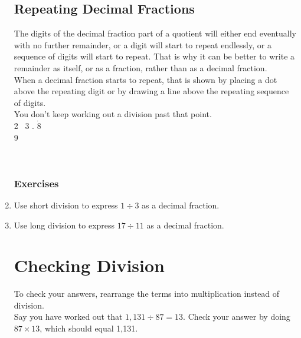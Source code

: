 \documentclass{article}
\begin{document}
\begin{enumerate}
\subsection*{Repeating Decimal Fractions}
The digits of the decimal fraction part of a quotient will either end eventually with no further remainder, or a digit will start to repeat endlessly, or a sequence of digits will start to repeat. That is why it can be better to write a remainder as itself, or as a fraction, rather than as a decimal fraction.\\

When a decimal fraction starts to repeat, that is shown by placing a dot above the repeating digit or by drawing a line above the repeating sequence of digits.\\

You don't keep working out a division past that point.\\

\hspace{12ex} 2 \ 3 . $\dot{8}$\\
\vspace{1pt}
\hspace{10ex} 9\ 

\begin{center}
\end{center}\\

\subsubsection{Exercises}

\item Use short division to express $1 \div 3$ as a decimal fraction.
\item Use long division to express $17 \div 11$ as a decimal fraction.

\pagebreak

\section{Checking Division}

To check your answers, rearrange the terms into multiplication instead of division.\\

Say you have worked out that $1,131 \div 87 = 13$. Check your answer by doing $87 \times 13$, which should equal 1,131.\\


\end{enumerate}
\end{document}
